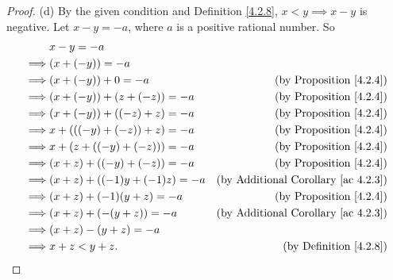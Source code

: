 \begin{proof}{(d)}
    By the given condition and Definition \ref{4.2.8}, \(x < y \implies x - y\) is negative.
    Let \(x - y = -a\), where \(a\) is a positive rational number.
    So
    \begin{align*}
                 & x - y = -a                                                                       \\
        \implies & (x + (-y)) = -a                                                                  \\
        \implies & (x + (-y)) + 0 = -a            & \text{(by Proposition \ref{4.2.4})}             \\
        \implies & (x + (-y)) + (z + (-z)) = -a   & \text{(by Proposition \ref{4.2.4})}             \\
        \implies & (x + (-y)) + ((-z) + z) = -a   & \text{(by Proposition \ref{4.2.4})}             \\
        \implies & x + (((-y) + (-z)) + z) = -a   & \text{(by Proposition \ref{4.2.4})}             \\
        \implies & x + (z + ((-y) + (-z))) = -a   & \text{(by Proposition \ref{4.2.4})}             \\
        \implies & (x + z) + ((-y) + (-z)) = -a   & \text{(by Proposition \ref{4.2.4})}             \\
        \implies & (x + z) + ((-1)y + (-1)z) = -a & \text{(by Additional Corollary \ref{ac 4.2.3})} \\
        \implies & (x + z) + (-1)(y + z) = -a     & \text{(by Proposition \ref{4.2.4})}             \\
        \implies & (x + z) + (-(y + z)) = -a      & \text{(by Additional Corollary \ref{ac 4.2.3})} \\
        \implies & (x + z) - (y + z) = -a                                                           \\
        \implies & x + z < y + z.                 & \text{(by Definition \ref{4.2.8})}              \\
    \end{align*}
\end{proof}

